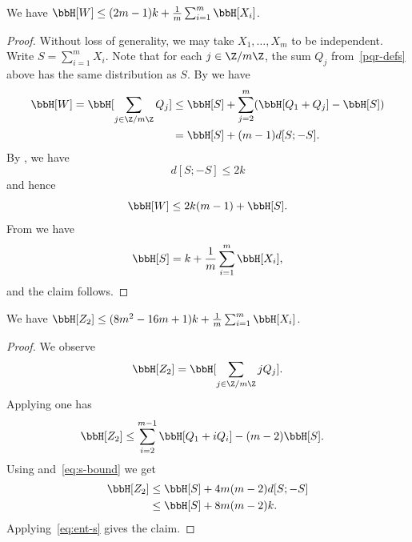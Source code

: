 \begin{lemma}[Entropy of $W$]\label{ent-w}\leanok  We have $\bbH[W] \leq (2m-1)k + \frac1m \sum_{i=1}^m \bbH[X_i]$.
\end{lemma}

\begin{proof}\leanok Without loss of generality, we may take $X_1,\dots,X_m$ to be independent. Write $S = \sum_{i=1}^m X_i$.
  Note that for each $j \in \Z/m\Z$, the sum $Q_j$ from~\eqref{pqr-defs} above has the same distribution as $S$.
  By  we have
  \begin{align*}
    \bbH[W] = \bbH[\sum_{j \in \Z/m\Z} Q_j]  & \leq \bbH[S] + \sum_{j=2}^m (\bbH[Q_1+Q_j] - \bbH[S]) \\ & = \bbH[S] + (m-1) d[S;-S].
  \end{align*}
  By , we have
  \begin{equation}
    \label{eq:s-bound}
    d[S; -S] \leq 2 k
  \end{equation}
  and hence
  \[
    \bbH[W] \leq 2 k (m-1) + \bbH[S].
  \]
  From  we have
  \begin{equation}
    \label{eq:ent-s}
    \bbH[S] = k + \frac1m \sum_{i=1}^m \bbH[X_i],
  \end{equation}
  and the claim follows.
\end{proof}

\begin{lemma}[Entropy of $Z_2$]\label{ent-z2}\leanok  We have $\bbH[Z_2] \leq (8m^2-16m+1) k + \frac{1}{m} \sum_{i=1}^m \bbH[X_i]$.
\end{lemma}

\begin{proof}\leanok
  We observe
  \[
    \bbH[Z_2] = \bbH[\sum_{j \in \Z/m\Z} j Q_j].
  \]
  Applying  one has
  \begin{align*}
    \bbH[Z_2] &\leq \sum_{i=2}^{m-1} \bbH[Q_1 + i Q_i]  - (m-2) \bbH[S].
  \end{align*}
  Using  and~\eqref{eq:s-bound} we get
  \begin{align*}
    \bbH[Z_2]
              &\leq \bbH[S] + 4m (m-2) d[S;-S] \\
              &\leq \bbH[S] + 8m (m-2) k.
  \end{align*}
  Applying~\eqref{eq:ent-s} gives the claim.
\end{proof}

